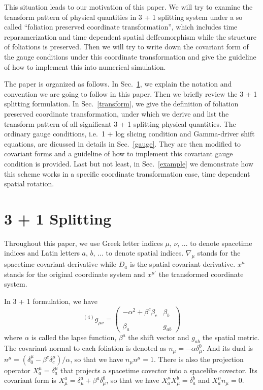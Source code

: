 \documentclass[letterpaper,nofootinbib,prd,amsmath,onecolumn]{revtex4-1}
\begin{document}
This situation leads to our motivation of this paper. We will try to examine the transform pattern of physical quantities in 3 + 1 splitting system under a so called ``foliation preserved coordinate transformation'', which includes time reparamerization and time dependent spatial deffeomorphism while the structure of foliations is preserved. Then we will try to write down the covariant form of the gauge conditions under this coordinate transformation and give the guideline of how to implement this into numerical simulation. 

The paper is organized as follows. In Sec.~\ref{3+1}, we explain the notation and convention we are going to follow in this paper. Then we briefly review the 3 + 1 splitting formulation. In Sec.~\ref{transform}, we give the definition of foliation preserved coordinate transformation, under which we derive and list the transform pattern of all significant 3 + 1 splitting physical quantities. The ordinary gauge conditions, i.e.~1 + log slicing condition and Gamma-driver shift equations, are dicussed in details in Sec.~\ref{gauge}. They are then modified to covariant forms and a guideline of how to implement this covariant gauge condition is provided. Last but not least, in Sec.~\ref{example} we demonstrate how this scheme works in a specific coordinate transformation case, time dependent spatial rotation.
\section{3 + 1 Splitting}\label{3+1}
Throughout this paper, we use Greek letter indices $\mu$, $\nu$, ... to denote spacetime indices and Latin letters $a$, $b$, ... to denote spatial indices. $\nabla_{\mu}$ stands for the spacetime covariant derivative while $D_{a}$ is the spatial covariant derivative. $x^{\mu}$ stands for the original coordinate system and $x^{\mu '}$ the transformed coordinate system. 

In 3 + 1 formulation, we have
\begin{equation*}
^{(4)}g_{\mu\nu} = \begin{pmatrix}-\alpha^2 + \beta^{c}\beta_{c} & \beta_{b}\\\\\beta_{a} & g_{ab}\end{pmatrix}
\end{equation*}
where $\alpha$ is called the lapse function, $\beta^{a}$ the shift vector and $g_{ab}$ the spatial metric. The covariant normal to each foliation is denoted as $n_{\mu} = -\alpha\delta^{0}_{\mu}$. And its dual is $n^{\mu} = (\delta^{\mu}_{0} - \beta^{c}\delta^{\mu}_{c})/\alpha$, so that we have $n_{\mu}n^{\mu} = 1$. There is also the projection operator $X^{\mu}_{a} = \delta^{\mu}_{a}$ that projects a spacetime covector into a spacelike covector. Its covariant form is $X^{a}_{\mu} = \delta^{a}_{\mu} + \beta^{a}\delta^{0}_{\mu}$, so that we have $X^{\mu}_{a}X^{b}_{\mu} = \delta^{b}_{a}$ and $X^{\mu}_{a}n_{\mu} = 0$. 
\end{document}
